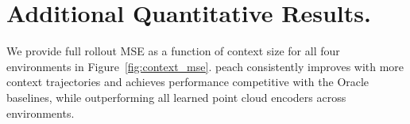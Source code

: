 \section{Additional Quantitative Results.} \label{app:quant}
We provide full rollout MSE as a function of context size for all four environments in Figure~\ref{fig:context_mse}. \gls{peach} consistently improves with more context trajectories and achieves performance competitive with the Oracle baselines, while outperforming all learned point cloud encoders across environments.


